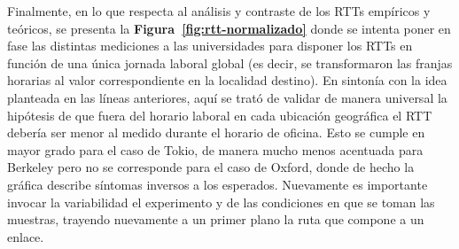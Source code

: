 \indent Finalmente, en lo que respecta al análisis y contraste de los RTTs empíricos y teóricos, se presenta la \textbf{Figura~\ref{fig:rtt-normalizado}} donde se intenta poner en fase las distintas mediciones a las universidades para disponer los RTTs en función de una única jornada laboral global (es decir, se transformaron las franjas horarias al valor correspondiente en la localidad destino). En sintonía con la idea planteada en las líneas anteriores, aquí se trató de validar de manera universal la hipótesis de que fuera del horario laboral en cada ubicación geográfica el RTT debería ser menor al medido durante el horario de oficina. Esto se cumple en mayor grado para el caso de Tokio, de manera mucho menos acentuada para Berkeley pero no se corresponde para el caso de Oxford, donde de hecho la gráfica describe síntomas inversos a los esperados. Nuevamente es importante invocar la variabilidad el experimento y de las condiciones en que se toman las muestras, trayendo nuevamente a un primer plano la ruta que compone a un enlace.
